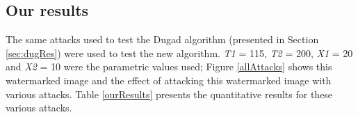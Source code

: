 \documentclass[10pt,twocolumn]{article}
\begin{document}


\subsection{Our results}
\label{ourResultsLena}
The same attacks used to test the Dugad algorithm (presented in Section
\ref{sec:dugRes})
were used to test the new algorithm.
\emph{T1} = 115, \emph{T2} = 200, \emph{X1} = 20 and \emph{X2} = 10
were the parametric values used; 
Figure \ref{allAttacks} shows
this watermarked image and the effect of attacking this watermarked image with various attacks.
Table \ref{ourResults} presents the quantitative results for these various attacks.
\end{document}
